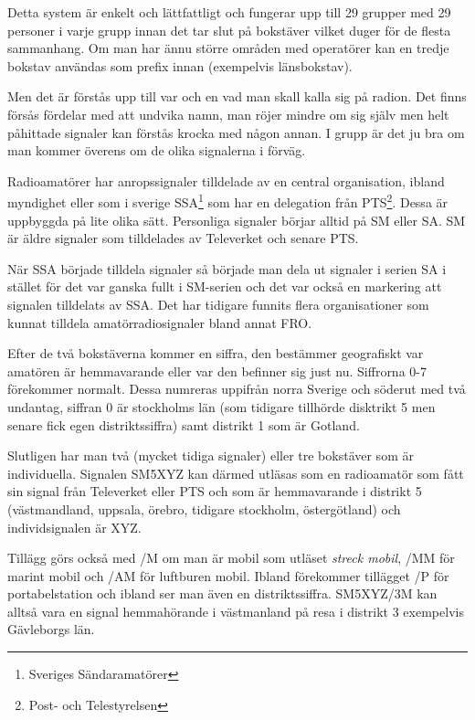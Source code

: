 Detta system är enkelt och lättfattligt och fungerar upp till 29 grupper med 29 personer i varje grupp innan det tar slut på bokstäver vilket duger för de flesta sammanhang. Om man har ännu större områden med operatörer kan en tredje bokstav användas som prefix innan (exempelvis länsbokstav).

Men det är förstås upp till var och en vad man skall kalla sig på radion. Det finns försås fördelar med att undvika namn, man röjer mindre om sig själv men helt påhittade signaler kan förstås krocka med någon annan. I grupp är det ju bra om man kommer överens om de olika signalerna i förväg.


Radioamatörer har anropssignaler tilldelade av en central organisation, ibland myndighet eller som i sverige SSA\footnote{Sveriges Sändaramatörer} som har en delegation från PTS\footnote{Post- och Telestyrelsen}. Dessa är uppbyggda på lite olika sätt. Personliga signaler börjar alltid på SM eller SA. SM är äldre signaler som tilldelades av Televerket och senare PTS. 

När SSA började tilldela signaler så började man dela ut signaler i serien SA i stället för det var ganska fullt i SM-serien och det var också en markering att signalen tilldelats av SSA. Det har tidigare funnits flera organisationer som kunnat tilldela amatörradiosignaler bland annat FRO.

Efter de två bokstäverna kommer en siffra, den bestämmer geografiskt var amatören är hemmavarande eller var den befinner sig just nu. Siffrorna 0-7 förekommer normalt. Dessa numreras uppifrån norra Sverige och söderut med två undantag, siffran 0 är stockholms län (som tidigare tillhörde disktrikt 5 men senare fick egen distriktssiffra) samt distrikt 1 som är Gotland. 

Slutligen har man två (mycket tidiga signaler) eller tre bokstäver som är individuella. Signalen SM5XYZ kan därmed utläsas som en radioamatör som fått sin signal från Televerket eller PTS och som är hemmavarande i distrikt 5 (västmandland, uppsala, örebro, tidigare stockholm, östergötland) och individsignalen är XYZ.

Tillägg görs också med /M om man är mobil som utläset \textit{streck mobil}, /MM för marint mobil och /AM för luftburen mobil. Ibland förekommer tillägget /P för portabelstation och ibland ser man även en distriktssiffra. SM5XYZ/3M kan alltså vara en signal hemmahörande i västmanland på resa i distrikt 3 exempelvis Gävleborgs län.

